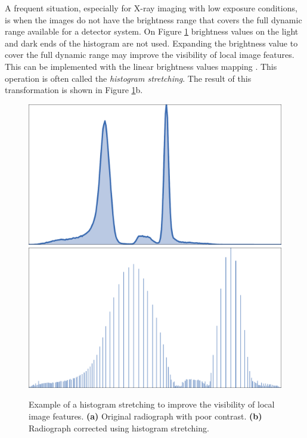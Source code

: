 A frequent situation, especially for X-ray imaging with low exposure conditions, is when the images do not have the brightness range that covers the full dynamic range available for a detector system. On Figure \ref{fig:histogram_stretch} brightness values on the light and dark ends of the histogram are not used.
Expanding the brightness value to cover the full dynamic range may improve the visibility of local image features. This can be implemented with the linear brightness values mapping \cite{Gonzalez08}. This operation is often called the \textit{histogram stretching}. The result of this transformation is shown in Figure \ref{fig:histogram_stretch}b.

\begin{figure}[ht]
  \centerline{
        \mbox{}
        \mbox{}
  }
  \vspace{3pt}
    \centerline{
    	\mbox{\includegraphics[scale= 0.29]{figures/egg1_hist.pdf}}
    	\mbox{\includegraphics[scale= 0.29]{figures/egg2_hist.pdf}}
    }

  \caption[]{Example of a histogram stretching to improve the visibility of local image features. \textbf{(a)} Original radiograph with poor contrast. \textbf{(b)} Radiograph corrected using histogram stretching.}
  \label{fig:histogram_stretch}
\end{figure}

